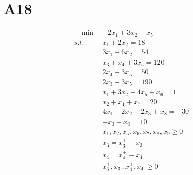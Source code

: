 \documentclass[fleqn,12pt]{scrartcl}
\begin{document}
\section*{A18}


\begin{align*}
	-\min\, &-2x_1 +3x_2 - x_5 \\
	s.t.\, &x_1 + 2x_2 = 18\\
	&3x_1 + 6x_2 = 54\\
	&x_3 + x_4 + 3x_5 = 120 \\
	&2x_4 + 3x_5 = 50\\
	&2x_3 + 3x_5 = 190 \\
	&x_1 + 3x_2 - 4x_5 + x_6 = 1 \\
	&x_2 + x_4 + x_7 = 20\\
	&4x_1 + 2x_2 - 2x_3 + x_8 = -30\\
	&-x_3 + x_9 = 10\\
	&x_1,x_2,x_5, x_6, x_7, x_8, x_9 \geq 0\\
	&x_3 = x_3^+ - x_3^-\\
	&x_4 = x_4^+ - x_4^-\\
	&x_3^+, x_3^-, x_4^+, x_4^- \geq 0
\end{align*}
\end{document}
